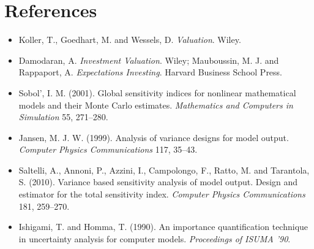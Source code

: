 \documentclass[11pt,a4paper]{article}
\begin{document}
\section*{References}
\vspace{-0.5em}
\begin{itemize}\footnotesize\setlength{\itemsep}{0pt}\setlength{\parskip}{0pt}
\item Koller, T., Goedhart, M. and Wessels, D. \emph{Valuation}. Wiley.
\item Damodaran, A. \emph{Investment Valuation}. Wiley; Mauboussin, M. J. and Rappaport, A. \emph{Expectations Investing}. Harvard Business School Press.
\item Sobol', I. M. (2001). Global sensitivity indices for nonlinear mathematical models and their Monte Carlo
  estimates. \emph{Mathematics and Computers in Simulation} 55, 271--280.
\item Jansen, M. J. W. (1999). Analysis of variance designs for model output. \emph{Computer Physics Communications}
  117, 35--43.
\item Saltelli, A., Annoni, P., Azzini, I., Campolongo, F., Ratto, M. and Tarantola, S. (2010). Variance based
  sensitivity analysis of model output. Design and estimator for the total sensitivity index. \emph{Computer Physics
  Communications} 181, 259--270.
\item Ishigami, T. and Homma, T. (1990). An importance quantification technique in uncertainty analysis for computer
  models. \emph{Proceedings of ISUMA '90}.
\end{itemize}
\end{document}
